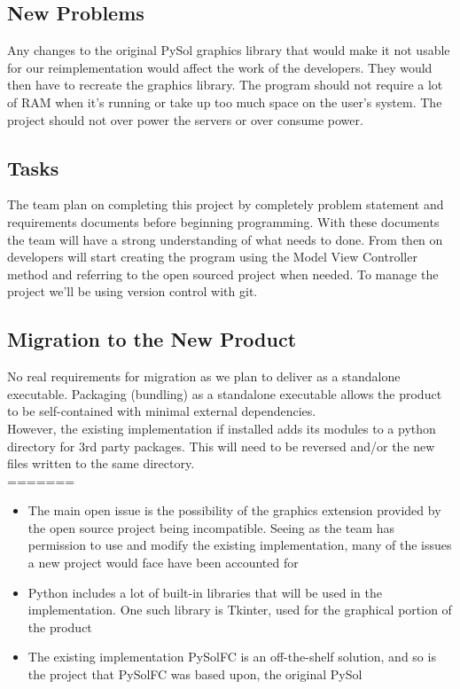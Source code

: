 \documentclass{article}
\begin{document}
		\subsection{New Problems}
		\indent \indent Any changes to the original PySol graphics library that would make it not usable for our reimplementation would affect the work of the developers. They would then have to recreate the graphics library. The program should not require a lot of RAM when it’s running or take up too much space on the user’s system. The project should not over power the servers or over consume power.\\
		\subsection{Tasks}
		\indent \indent The team plan on completing this project by completely problem statement and requirements documents before beginning programming. With these documents the team will have a strong understanding of what needs to done. From then on developers will start creating the program using the Model View Controller method and referring to the open sourced project when needed. To manage the project we’ll be using version control with git. \\


		\subsection{Migration to the New Product}
		\indent \indent No real requirements for migration as we plan to deliver as a standalone executable. Packaging (bundling) as a standalone executable allows the product to be self-contained with minimal external dependencies.\\
		\indent However, the existing implementation if installed adds its modules to a python directory for 3rd party packages. This will need to be reversed and/or the new files written to the same directory.\\
=======
		\begin{itemize}
		\itemsep0em	
			\item The main open issue is the possibility of the graphics extension
			provided by the open source project being incompatible. Seeing as the team
			has permission to use and modify the existing implementation, many of the
			issues a new project would face have been accounted for
			\item Python includes a lot of built-in libraries that will be used in the
			 implementation. One such library is Tkinter, used for the graphical portion
			of the product
			\item The existing implementation PySolFC is an off-the-shelf solution,
			and so is the project that PySolFC was based upon, the original PySol
		\end{itemize}
\end{document}
